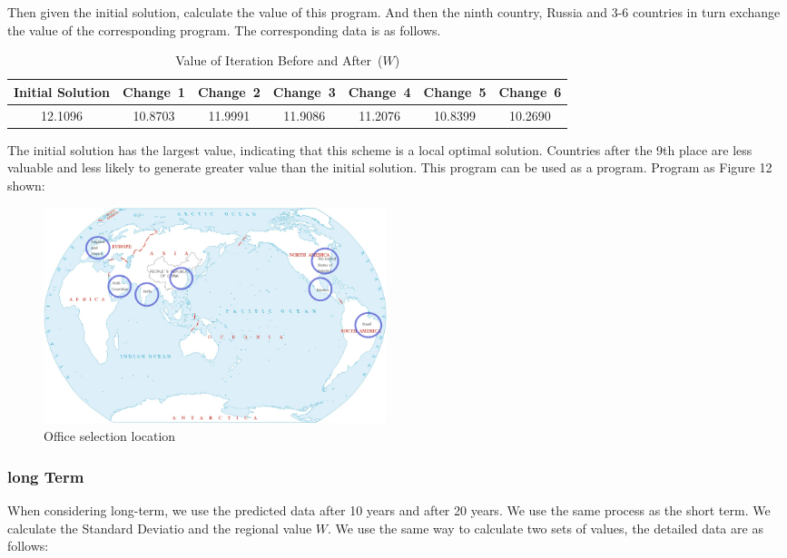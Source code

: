 \documentclass{mcmthesis}
\begin{document}
    Then given the initial solution, calculate the value of this program.
    And then the ninth country, Russia and 3-6 countries in turn exchange the value of the corresponding program.
    The corresponding data is as follows.
    \begin{table}[h]
      \centering
      \caption{Value of Iteration Before and After\ ($W$)}

      \begin{tabular}{ccccccc}
        \toprule%
        Initial Solution&Change\ 1&Change\ 2&Change\ 3&Change\ 4&Change\ 5&Change\ 6\\
        \midrule%
          12.1096&10.8703&11.9991&11.9086&11.2076&10.8399&10.2690\\
        \bottomrule%
      \end{tabular}
    \end{table}

    The initial solution has the largest value, indicating that this scheme is a local optimal solution.
    Countries after the 9th place are less valuable and less likely to generate greater value than the initial solution.
    This program can be used as a program.
    Program as Figure 12 shown:

    \begin{figure}[h]
      \centering
      \includegraphics[height=6.3cm,width=10cm]{p8.png}
      \caption{Office selection location}
      \label{p14}
    \end{figure}

    \subsubsection{long Term}
    When considering long-term, we use the predicted data after 10 years and after 20 years.
    We use the same process as the short term.
    We calculate the Standard Deviatio and the regional value $W$.
    We use the same way to calculate two sets of values, the detailed data are as follows:
\end{document}
